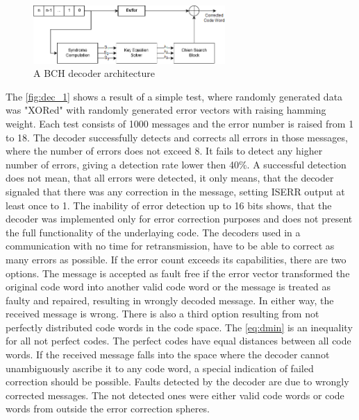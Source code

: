 \begin{figure}[h]
\centering
\includegraphics[width=0.65\textwidth]{figures/BCH_DEC.png}
\caption{A BCH decoder architecture \cite{art:BCH_implement}}
\label{fig:dec_0}
\end{figure}


The \autoref{fig:dec_1} shows a result of a simple test, where randomly generated data was "XORed" with randomly generated error vectors with raising hamming weight. Each test consists of 1000 messages and the error number is raised from 1 to 18. The decoder successfully detects and corrects all errors in those messages, where the number of errors does not exceed 8. It fails to detect any higher number of errors, giving a detection rate lower then 40\%. A successful detection does not mean, that all errors were detected, it only means, that the decoder signaled that there was any correction in the message, setting ISERR output at least once to 1.  The inability of error detection up to 16 bits shows, that the decoder was implemented only for error correction purposes and does not present the full functionality of the underlaying code. The decoders used in a communication with no time for retransmission, have to be able to correct as many errors as possible. If the error count exceeds its capabilities, there are two options. The message is accepted as fault free if the error vector transformed the original code word into another valid code word or the message is treated as faulty and repaired, resulting in wrongly decoded message. In either way, the received message is wrong. There is also a third option resulting from not perfectly distributed code words in the code space. The \autoref{eq:dmin} is an inequality for all not perfect codes. The perfect codes have equal distances between all code words. If the received message falls into the space where the decoder cannot unambiguously ascribe it to any code word, a special indication of failed correction should be possible. Faults detected by the decoder are due to wrongly corrected messages. The not detected ones were either valid code words or code words from outside the error correction spheres.

